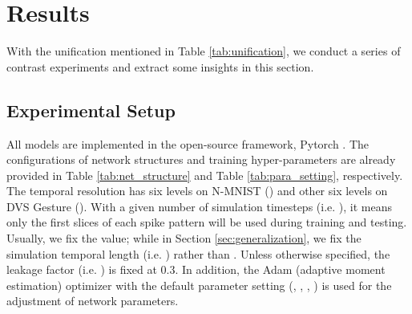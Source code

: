 \documentclass[journal,10pt,twocolumn]{IEEETran}
\begin{document}
\begin{table}[!htbp]
\caption{Unification for comparison.}
\label{tab:unification}
\vspace{2pt}
\centering
\renewcommand\arraystretch{1.4}
\end{table}
 \section{Results}\label{sec:result}

With the unification mentioned in Table \ref{tab:unification}, we conduct a series of contrast experiments and extract some insights in this section.

\subsection{Experimental Setup}
All models are implemented in the open-source framework, Pytorch \cite{paszke2019pytorch}. The configurations of network structures and training hyper-parameters are already provided in Table \ref{tab:net_structure} and Table \ref{tab:para_setting}, respectively. The temporal resolution has six levels on N-MNIST () and other six levels on DVS Gesture (). With a given number of simulation timesteps (i.e. ), it means only the first  slices of each spike pattern will be used during training and testing. Usually, we fix the  value; while in Section \ref{sec:generalization}, we fix the simulation temporal length (i.e. ) rather than . Unless otherwise specified, the leakage factor (i.e. ) is fixed at 0.3. In addition, the Adam (adaptive moment estimation) optimizer \cite{kingma2014adam} with the default parameter setting (, , , ) is used for the adjustment of network parameters. 
\end{document}
